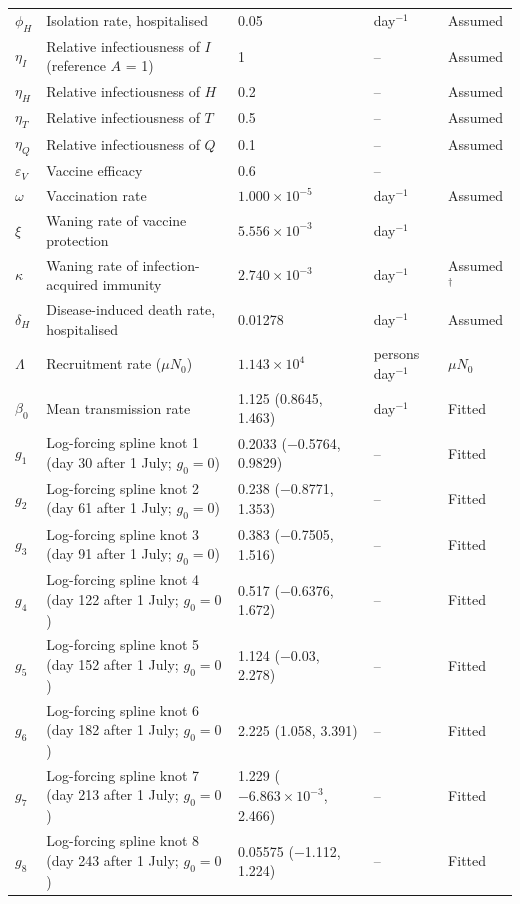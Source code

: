 \documentclass[12pt,a4paper]{article}
\theoremstyle{definition}
\theoremstyle{remark}
\begin{document}
\begin{longtable}{p{1.5cm}p{4.6cm}p{4.3cm}p{1.9cm}p{2.0cm}}
$\phi_H$ & Isolation rate, hospitalised & 0.05 & day$^{-1}$ & Assumed\\
$\eta_I$ & Relative infectiousness of $I$ (reference $A$ = 1) & 1 & -- & Assumed\\
$\eta_H$ & Relative infectiousness of $H$ & 0.2 & -- & Assumed\\
$\eta_T$ & Relative infectiousness of $T$ & 0.5 & -- & Assumed\\
$\eta_Q$ & Relative infectiousness of $Q$ & 0.1 & -- & Assumed\\
$\varepsilon_V$ & Vaccine efficacy & 0.6 & -- & \cite{osterholm2012efficacy}\\
$\omega$ & Vaccination rate & $1.000\times10^{-5}$ & day$^{-1}$ & Assumed\\
$\xi$ & Waning rate of vaccine protection & $5.556\times10^{-3}$ & day$^{-1}$ & \cite{ferdinands2017intraseason}\\
$\kappa$ & Waning rate of infection-acquired immunity & $2.740\times10^{-3}$ & day$^{-1}$ & Assumed$^{\dagger}$\\
$\delta_H$ & Disease-induced death rate, hospitalised & 0.01278 & day$^{-1}$ & Assumed\\
$\Lambda$ & Recruitment rate ($\mu N_0$) & $1.143\times10^{4}$ & persons day$^{-1}$ & $\mu N_0$\\
$\beta_0$ & Mean transmission rate & 1.125 (0.8645, 1.463) & day$^{-1}$ & Fitted\\
$g_{1}$ & Log-forcing spline knot 1 (day 30 after 1 July; $g_0=0$) & 0.2033 ($-$0.5764, 0.9829) & -- & Fitted\\
$g_{2}$ & Log-forcing spline knot 2 (day 61 after 1 July; $g_0=0$) & 0.238 ($-$0.8771, 1.353) & -- & Fitted\\
$g_{3}$ & Log-forcing spline knot 3 (day 91 after 1 July; $g_0=0$) & 0.383 ($-$0.7505, 1.516) & -- & Fitted\\
$g_{4}$ & Log-forcing spline knot 4 (day 122 after 1 July; $g_0=0$) & 0.517 ($-$0.6376, 1.672) & -- & Fitted\\
$g_{5}$ & Log-forcing spline knot 5 (day 152 after 1 July; $g_0=0$) & 1.124 ($-$0.03, 2.278) & -- & Fitted\\
$g_{6}$ & Log-forcing spline knot 6 (day 182 after 1 July; $g_0=0$) & 2.225 (1.058, 3.391) & -- & Fitted\\
$g_{7}$ & Log-forcing spline knot 7 (day 213 after 1 July; $g_0=0$) & 1.229 ($-6.863\times10^{-3}$, 2.466) & -- & Fitted\\
$g_{8}$ & Log-forcing spline knot 8 (day 243 after 1 July; $g_0=0$) & 0.05575 ($-$1.112, 1.224) & -- & Fitted\\

\end{longtable}
\end{document}
